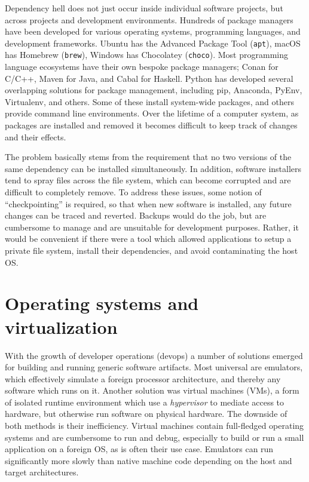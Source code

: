 \documentclass[12pt,initial,twoside,maitrise]{dms}
\def\inline{\lstinline[basicstyle=\ttfamily]}
\numberwithin{equation}{section}
\numberwithin{table}{chapter}
\numberwithin{figure}{chapter}
\begin{document}
Dependency hell does not just occur inside individual software projects, but across projects and development environments. Hundreds of package managers have been developed for various operating systems, programming languages, and development frameworks. Ubuntu has the Advanced Package Tool (\inline{apt}), macOS has Homebrew (\inline{brew}), Windows has Chocolatey (\inline{choco}). Most programming language ecosystems have their own bespoke package managers; Conan for C/C++, Maven for Java, and Cabal for Haskell. Python has developed several overlapping solutions for package management, including pip, Anaconda, PyEnv, Virtualenv, and others. Some of these install system-wide packages, and others provide command line environments. Over the lifetime of a computer system, as packages are installed and removed it becomes difficult to keep track of changes and their effects.

The problem basically stems from the requirement that no two versions of the same dependency can be installed simultaneously. In addition, software installers tend to spray files across the file system, which can become corrupted and are difficult to completely remove. To address these issues, some notion of ``checkpointing'' is required, so that when new software is installed, any future changes can be traced and reverted. Backups would do the job, but are cumbersome to manage and are unsuitable for development purposes. Rather, it would be convenient if there were a tool which allowed applications to setup a private file system, install their dependencies, and avoid contaminating the host OS.

\section{Operating systems and virtualization}\label{sec:os-and-virtualization}

With the growth of developer operations (devops) a number of solutions emerged for building and running generic software artifacts. Most universal are emulators, which effectively simulate a foreign processor architecture, and thereby any software which runs on it. Another solution was virtual machines (VMs), a form of isolated runtime environment which use a \textit{hypervisor} to mediate access to hardware, but otherwise run software on physical hardware. The downside of both methods is their inefficiency. Virtual machines contain full-fledged operating systems and are cumbersome to run and debug, especially to build or run a small application on a foreign OS, as is often their use case. Emulators can run significantly more slowly than native machine code depending on the host and target architectures.
\end{document}
